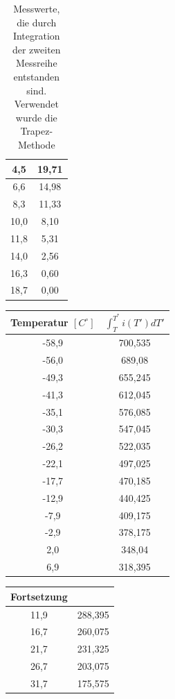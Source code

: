 \begin{table}[htbp]
\begin{minipage}[t]{0.45\textwidth}
\begin{tabular}{c|c}
4,5 &19,71\\\hline
6,6 &14,98\\\hline
8,3 &11,33\\\hline
10,0 &8,10\\\hline
11,8 &5,31\\\hline
14,0 &2,56\\\hline
16,3 &0,60\\\hline
18,7 &0,00\\\hline
\end{tabular}
\end{minipage}
\caption{Messwerte, die durch Integration der zweiten Messreihe entstanden sind. Verwendet wurde die Trapez-Methode }
\label{tab_int1}
\end{table}

\begin{table}[htbp]
\begin{minipage}[t]{0.45\textwidth}
\centering
\begin{tabular}{c|c}
Temperatur $[C^\circ]$ & $\int ^{T^*}_{T} i(T')dT'$\\\hline
-58,9 &700,535\\\hline
-56,0 &689,08\\\hline
-49,3 &655,245\\\hline
-41,3 &612,045\\\hline
-35,1 &576,085\\\hline
-30,3 &547,045\\\hline
-26,2 &522,035\\\hline
-22,1 &497,025\\\hline
-17,7 &470,185\\\hline
-12,9 &440,425\\\hline
-7,9 &409,175\\\hline
-2,9 &378,175\\\hline
2,0 &348,04\\\hline
6,9 &318,395\\
\end{tabular}
\end{minipage}
\begin{minipage}[t]{0.45\textwidth}
\centering
\begin{tabular}{c|c}
Fortsetzung & \\\hline
11,9 &288,395\\\hline
16,7 &260,075\\\hline
21,7 &231,325\\\hline
26,7 &203,075\\\hline
31,7 &175,575\\\hline

\end{tabular}
\end{minipage}
\end{table}
